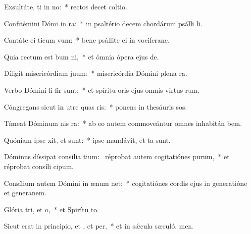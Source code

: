 \item Exsultáte, ti in no:~* rectos decet coltio.
\item Confitémini Dómi in ra:~* in psaltério decem chordárum psálli li.
\item Cantáte ei ticum vum:~* bene psállite ei in vociferane.
\item Quia rectum est bum ni,~* et ómnia ópera ejus  de.
\item Díligit misericórdiam  juum:~* misericórdia Dómini plena  ra.
\item Verbo Dómini li fir sunt:~* et spíritu oris ejus omnis virtus rum.
\item Cóngregans sicut in utre quas ris:~* ponens in thesáuris sos.
\item Tímeat Dóminum nis ra:~* ab eo autem commoveántur omnes inhabitán bem.
\item Quóniam ipse xit, et  sunt:~* ipse mandávit, et ta sunt.
\item Dóminus díssipat consília tium:~\pscross{} réprobat autem cogitatiónes purum,~* et réprobat consíli cipum.
\item Consílium autem Dómini in ænum net:~* cogitatiónes cordis ejus in generatióne et generanem.
\item Glória tri, et o,~* et Spirítu to.
\item Sicut erat in princípio, et , et per,~* et in sǽcula sæculó. men.

